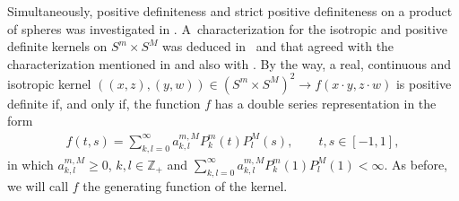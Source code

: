 Simultaneously, positive def\/initeness and strict positive def\/initeness on a product of spheres was investigated in \cite{jean0,jean,jean1}. A~characterization for the isotropic and positive def\/inite kernels on $S^m \times S^M$ was deduced in~\cite{jean} and that agreed with the characterization mentioned in \cite{berg} and also with \cite[Chapter~4]{shapiro}. By the way, a real, continuous and isotropic kernel $((x,z), (y,w)) \in (S^m \times S^M)^2 \to f(x \cdot y, z \cdot w)$ is positive def\/inite if, and only if, the function $f$ has a double series representation in the form
\begin{gather}\label{requ}
f(t,s) = \sum_{k,l=0}^{\infty}a_{k,l}^{m,M}P_{k}^{m}(t)P_{l}^{M}(s), \qquad t,s \in [-1,1],
\end{gather}
in which $a_{k,l}^{m,M}\geq 0$, $k,l\in \mathbb{Z}_+$ and $\sum\limits_{k,l=0}^{\infty}a_{k,l}^{m,M}P_{k}^{m}(1)P_{l}^{M}(1)<\infty$. As before, we will call $f$ the generating function of the kernel.
